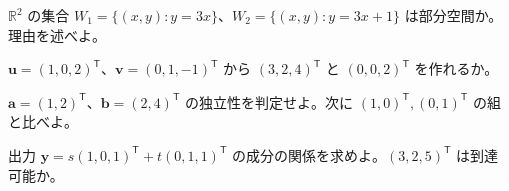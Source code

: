 \documentclass[11pt]{article}
\begin{document}

\problem[部分空間の判定]
$\mathbb R^2$ の集合 $W_1=\{(x,y):y=3x\}$、$W_2=\{(x,y):y=3x+1\}$ は部分空間か。理由を述べよ。
\workspace{38mm}

\problem[生成の範囲]
$\boldsymbol u=(1,0,2)^{\mathsf T}$、$\boldsymbol v=(0,1,-1)^{\mathsf T}$ から $(3,2,4)^{\mathsf T}$ と $(0,0,2)^{\mathsf T}$ を作れるか。
\workspace{38mm}
\newpage

\problem[独立性]
$\boldsymbol a=(1,2)^{\mathsf T}$、$\boldsymbol b=(2,4)^{\mathsf T}$ の独立性を判定せよ。次に $(1,0)^{\mathsf T},(0,1)^{\mathsf T}$ の組と比べよ。
\workspace{38mm}

\problem[出力制約]
出力 $\boldsymbol y=s(1,0,1)^{\mathsf T}+t(0,1,1)^{\mathsf T}$ の成分の関係を求めよ。$(3,2,5)^{\mathsf T}$ は到達可能か。
\workspace{38mm}
\end{document}
